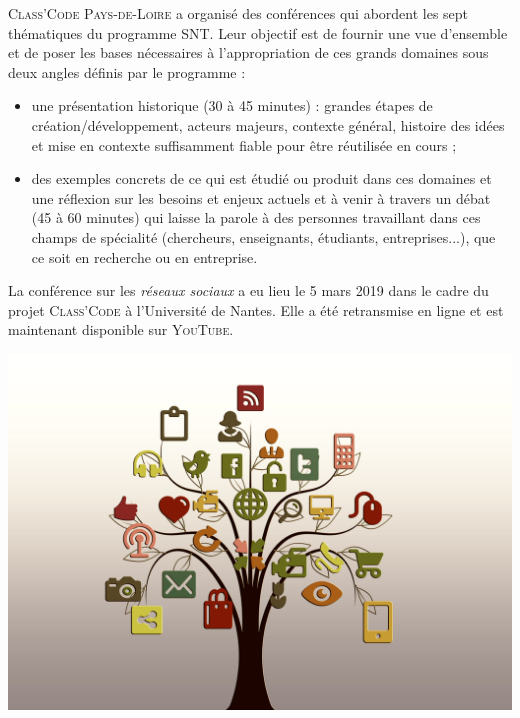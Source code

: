 \textsc{Class'Code} \textsc{Pays-de-Loire} a organisé des conférences qui abordent les sept thématiques du programme SNT. Leur objectif est de fournir une vue d’ensemble et de poser les bases nécessaires à l’appropriation de ces grands domaines sous deux angles définis par le programme :
\begin{itemize}
\item une présentation historique (30 à 45 minutes) : grandes étapes de création/développement, acteurs majeurs, contexte général, histoire des idées et mise en contexte suffisamment fiable pour être réutilisée en cours ;
\item des exemples concrets de ce qui est étudié ou produit dans ces domaines et une réflexion sur les besoins et enjeux actuels et à venir à travers un débat (45 à 60 minutes) qui laisse la parole à des personnes travaillant dans ces champs de spécialité  (chercheurs, enseignants, étudiants, entreprises...), que ce soit en recherche ou en entreprise.
\end{itemize}

La conférence sur les \textit{réseaux sociaux} a eu lieu le 5 mars 2019 dans le cadre du projet \textsc{Class'Code} à l’Université de Nantes. Elle a été retransmise en ligne et est maintenant disponible sur \textsc{YouTube}.

\begin{jazzgraphic*}
%
\includegraphics[width=\linewidth]{./Images/Chapter09/tree-gerd-altmann-pixabay.jpg}%
\end{jazzgraphic*}

